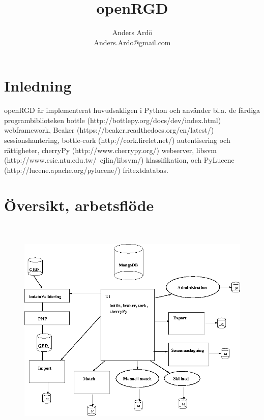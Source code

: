\documentclass[swedish,11pt]{article}
\title{openRGD}
\author{Anders Ardö\\Anders.Ardo@gmail.com}
\begin{document}
\maketitle

\section{Inledning}
openRGD är implementerat huvudsakligen i Python och använder
bl.a. de färdiga programbiblioteken bottle (http://bottlepy.org/docs/dev/index.html) webframework,
Beaker (https://beaker.readthedocs.org/en/latest/)
sessionshantering, bottle-cork (http://cork.firelet.net/)
autentisering och rättigheter, 
cherryPy (http://www.cherrypy.org/) webserver, libsvm
(http://www.csie.ntu.edu.tw/~cjlin/libsvm/) klassifikation, och PyLucene
(http://lucene.apache.org/pylucene/) fritextdatabas.

\section{Översikt, arbetsflöde}
\begin{figure}[htb]
\includegraphics[width=\textwidth,height=11cm]{openRGD}
\end{figure}
\end{document}
